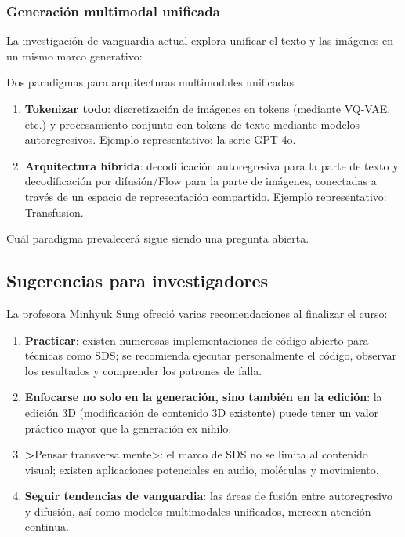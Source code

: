 \subsubsection{Generación multimodal unificada}

La investigación de vanguardia actual explora unificar el texto y las imágenes en un mismo marco generativo:

\begin{knowledgebox}{Dos paradigmas para arquitecturas multimodales unificadas}
\begin{enumerate}
    \item \textbf{Tokenizar todo}: discretización de imágenes en tokens (mediante VQ-VAE, etc.) y procesamiento conjunto con tokens de texto mediante modelos autoregresivos. Ejemplo representativo: la serie GPT-4o.
    \item \textbf{Arquitectura híbrida}: decodificación autoregresiva para la parte de texto y decodificación por difusión/Flow para la parte de imágenes, conectadas a través de un espacio de representación compartido. Ejemplo representativo: Transfusion.
\end{enumerate}

Cuál paradigma prevalecerá sigue siendo una pregunta abierta.
\end{knowledgebox}

\subsection{Sugerencias para investigadores}

La profesora Minhyuk Sung ofreció varias recomendaciones al finalizar el curso:

\begin{enumerate}
    \item \textbf{Practicar}: existen numerosas implementaciones de código abierto para técnicas como SDS; se recomienda ejecutar personalmente el código, observar los resultados y comprender los patrones de falla.
    \item \textbf{Enfocarse no solo en la generación, sino también en la edición}: la edición 3D (modificación de contenido 3D existente) puede tener un valor práctico mayor que la generación ex nihilo.
    \item \textbf>Pensar transversalmente>: el marco de SDS no se limita al contenido visual; existen aplicaciones potenciales en audio, moléculas y movimiento.
    \item \textbf{Seguir tendencias de vanguardia}: las áreas de fusión entre autoregresivo y difusión, así como modelos multimodales unificados, merecen atención continua.
\end{enumerate}

